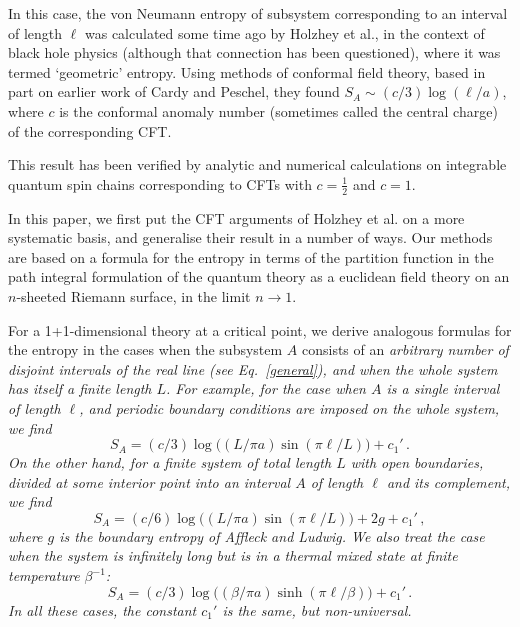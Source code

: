 \documentclass[12pt,aps]{revtex4}
\begin{document}
In this case, the von Neumann entropy of subsystem corresponding to an
interval of length $\ell$ was calculated some time ago by Holzhey et
al.\cite{Holzhey},
in the context of black hole physics (although that connection
has been questioned), where it was termed `geometric' entropy. Using
methods of conformal field theory, based in part on earlier work of
Cardy and Peschel\cite{CardyPeschel}, they found
$S_A\sim (c/3)\log(\ell/a)$, where $c$ is the conformal anomaly number
(sometimes called the central charge) of the corresponding CFT.

This result has been verified by analytic and numerical calculations on
integrable quantum spin chains corresponding to CFTs with $c=\frac12$
and $c=1$. \cite{Vidal,Korepin,leb}

In this paper, we first put the CFT arguments of Holzhey et al.\cite{Holzhey}
on a more
systematic basis, and generalise their result in a number of ways.
Our methods are based on a formula for the entropy in terms of the
partition function in the
path integral formulation of the quantum theory as a euclidean
field theory on an $n$-sheeted Riemann surface, in the limit $n\to1$.

For a 1+1-dimensional theory at a critical point, we derive analogous
formulas for the entropy in the cases when the subsystem $A$ consists
of an \em arbitrary \em number of disjoint intervals of the real line (see
Eq.~\ref{general}), and when the whole system has itself a finite length $L$.
For example, for the case when $A$ is a single interval of length
$\ell$, and periodic boundary conditions are imposed on the whole
system, we find
\begin{equation}
S_A=(c/3)\log\big((L/\pi a)\sin(\pi\ell/L)\big)+c_1'\,.
\end{equation}
On the other hand, for a finite system of total length $L$
with open boundaries, divided at some interior point into an interval
$A$ of length $\ell$ and its complement, we find
\begin{equation}
S_A=(c/6)\log\big((L/\pi a)\sin(\pi\ell/L)\big)+2g+c_1'\,,
\end{equation}
where $g$ is the boundary entropy of Affleck and
Ludwig\cite{AffleckLudwig}.
We also treat the case when the system is infinitely
long but is in a thermal mixed state at finite temperature $\beta^{-1}$:
\begin{equation}
\label{finiteT}
S_A=(c/3)\log\big((\beta/\pi a)\sinh(\pi\ell/\beta)\big)+c_1'\,.
\end{equation}
In all these cases, the constant $c_1'$ is the same, but
non-universal.
\end{document}
